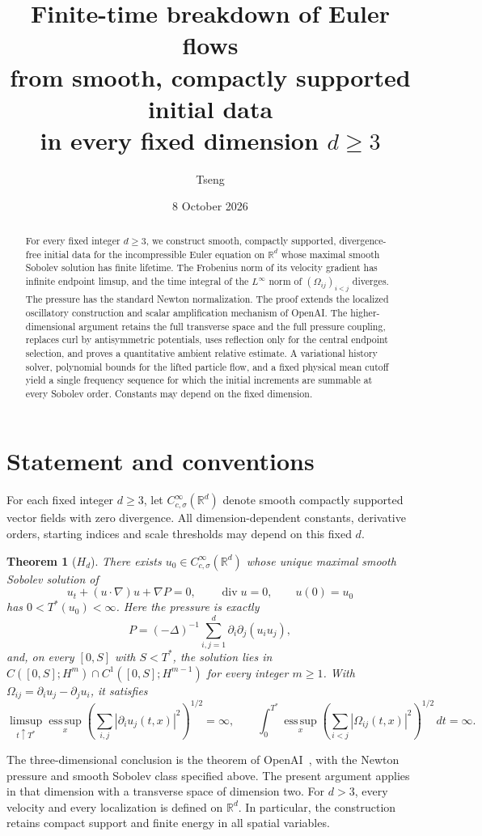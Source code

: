 \documentclass[11pt]{article}
\title{Finite-time breakdown of Euler flows\\from smooth, compactly supported initial data\\in every fixed dimension $d\geq3$}
\author{Tseng}
\date{8 October 2026}
\newcommand{\R}{\mathbb R}
\newcommand{\esssup}{\operatorname*{ess\,sup}}
\newtheorem{theorem}{Theorem}[section]
\theoremstyle{definition}
\begin{document}
\maketitle
\begin{abstract}
For every fixed integer $d\geq3$, we construct smooth, compactly supported,
divergence-free initial data for the incompressible Euler equation on
$\mathbb R^d$ whose maximal smooth Sobolev solution has finite lifetime.
The Frobenius norm of its velocity gradient has infinite endpoint limsup,
and the time integral of the $L^\infty$ norm of
$(\Omega_{ij})_{i<j}$ diverges. The pressure has the standard Newton normalization.
The proof extends the localized oscillatory construction and scalar
amplification mechanism of OpenAI. The higher-dimensional argument retains the full transverse
space and the full pressure coupling, replaces curl by antisymmetric
potentials, uses reflection only for the central endpoint selection, and
proves a quantitative ambient relative estimate. A variational history
solver, polynomial bounds for the lifted particle flow, and a
fixed physical mean cutoff yield a single frequency sequence for which
the initial increments are summable at every Sobolev order. Constants
may depend on the fixed dimension.
\end{abstract}

\section{Statement and conventions}
For each fixed integer $d\geq3$, let
$C^\infty_{c,\sigma}(\R^d)$ denote smooth compactly supported vector fields
with zero divergence. All dimension-dependent constants, derivative orders,
starting indices and scale thresholds may depend on this fixed $d$.
\begin{theorem}[$H_d$]\label{target:Hd}
There exists $u_0\in C^\infty_{c,\sigma}(\R^d)$ whose unique maximal smooth
Sobolev solution of
\[
 u_t+(u\cdot\nabla)u+\nabla P=0,\qquad \operatorname{div}u=0,\qquad u(0)=u_0
\]
has $0<T^*(u_0)<\infty$. Here the pressure is exactly
\[
 P=(-\Delta)^{-1}\sum_{i,j=1}^d\partial_i\partial_j(u_i u_j),
\]
and, on every $[0,S]$ with $S<T^*$, the solution lies in
$C([0,S];H^m)\cap C^1([0,S];H^{m-1})$ for every integer $m\geq1$.
With $\Omega_{ij}=\partial_i u_j-\partial_j u_i$, it satisfies
\[
 \limsup_{t\uparrow T^*}\esssup_x
   \left(\sum_{i,j}|\partial_i u_j(t,x)|^2\right)^{1/2}=\infty,
 \qquad
 \int_0^{T^*}\esssup_x
   \left(\sum_{i<j}|\Omega_{ij}(t,x)|^2\right)^{1/2}\,dt=\infty.
\]
\end{theorem}
The three-dimensional conclusion is the theorem of OpenAI~\cite{OAI},
with the Newton pressure and smooth Sobolev class specified above.
The present argument applies in that dimension with a transverse space
of dimension two. For $d>3$, every velocity and every localization is
defined on $\R^d$. In particular, the construction retains compact
support and finite energy in all spatial variables.
\end{document}
